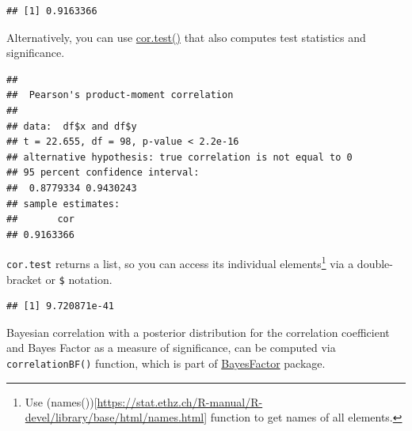 \documentclass[
]{book}
\newenvironment{Shaded}{\begin{snugshade}}{\end{snugshade}}
\newcommand{\AttributeTok}[1]{\textcolor[rgb]{0.77,0.63,0.00}{#1}}
\newcommand{\FunctionTok}[1]{\textcolor[rgb]{0.00,0.00,0.00}{#1}}
\newcommand{\NormalTok}[1]{#1}
\newcommand{\OtherTok}[1]{\textcolor[rgb]{0.56,0.35,0.01}{#1}}
\newcommand{\SpecialCharTok}[1]{\textcolor[rgb]{0.00,0.00,0.00}{#1}}
\newcommand{\StringTok}[1]{\textcolor[rgb]{0.31,0.60,0.02}{#1}}
\begin{document}
\begin{verbatim}
## [1] 0.9163366
\end{verbatim}

Alternatively, you can use \href{https://stat.ethz.ch/R-manual/R-devel/library/stats/html/cor.test.html}{cor.test()} that also computes test statistics and significance.

\begin{Shaded}
\end{Shaded}

\begin{verbatim}
## 
##  Pearson's product-moment correlation
## 
## data:  df$x and df$y
## t = 22.655, df = 98, p-value < 2.2e-16
## alternative hypothesis: true correlation is not equal to 0
## 95 percent confidence interval:
##  0.8779334 0.9430243
## sample estimates:
##       cor 
## 0.9163366
\end{verbatim}

\texttt{cor.test} returns a list, so you can access its individual elements\footnote{Use (names()){[}\url{https://stat.ethz.ch/R-manual/R-devel/library/base/html/names.html}{]} function to get names of all elements.} via a double-bracket or \texttt{\$} notation.

\begin{Shaded}
\end{Shaded}

\begin{verbatim}
## [1] 9.720871e-41
\end{verbatim}

Bayesian correlation with a posterior distribution for the correlation coefficient and Bayes Factor as a measure of significance, can be computed via \texttt{correlationBF()} function, which is part of \href{https://richarddmorey.github.io/BayesFactor}{BayesFactor} package.

\begin{Shaded}
\end{Shaded}
\end{document}
